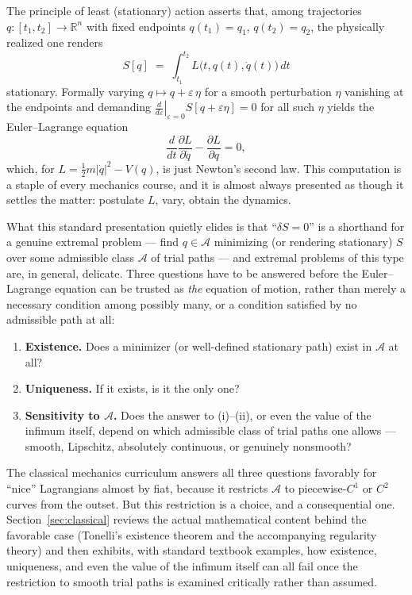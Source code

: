 \documentclass[11pt]{article}
\newcommand{\R}{\mathbb{R}}
\newcommand{\A}{\mathcal{A}}
\newcommand{\eps}{\varepsilon}
\begin{document}
The principle of least (stationary) action asserts that, among trajectories $q:[t_1,t_2]\to\R^n$ with fixed endpoints $q(t_1)=q_1$, $q(t_2)=q_2$, the physically realized one renders
\[
S[q] \;=\; \int_{t_1}^{t_2} L\bigl(t,q(t),\dot q(t)\bigr)\,dt
\]
stationary. Formally varying $q\mapsto q+\eps\,\eta$ for a smooth perturbation $\eta$ vanishing at the endpoints and demanding $\left.\frac{d}{d\eps}\right|_{\eps=0}S[q+\eps\eta]=0$ for all such $\eta$ yields the Euler--Lagrange equation
\[
\frac{d}{dt}\frac{\partial L}{\partial \dot q} - \frac{\partial L}{\partial q} = 0,
\]
which, for $L=\tfrac12 m|\dot q|^2 - V(q)$, is just Newton's second law. This computation is a staple of every mechanics course, and it is almost always presented as though it settles the matter: postulate $L$, vary, obtain the dynamics.

What this standard presentation quietly elides is that ``$\delta S=0$'' is a shorthand for a genuine extremal problem --- find $q\in\A$ minimizing (or rendering stationary) $S$ over some admissible class $\A$ of trial paths --- and extremal problems of this type are, in general, delicate. Three questions have to be answered before the Euler--Lagrange equation can be trusted as \emph{the} equation of motion, rather than merely a necessary condition among possibly many, or a condition satisfied by no admissible path at all:
\begin{enumerate}[label=(\roman*)]
\item \textbf{Existence.} Does a minimizer (or well-defined stationary path) exist in $\A$ at all?
\item \textbf{Uniqueness.} If it exists, is it the only one?
\item \textbf{Sensitivity to $\A$.} Does the answer to (i)--(ii), or even the value of the infimum itself, depend on which admissible class of trial paths one allows --- smooth, Lipschitz, absolutely continuous, or genuinely nonsmooth?
\end{enumerate}
The classical mechanics curriculum answers all three questions favorably for ``nice'' Lagrangians almost by fiat, because it restricts $\A$ to piecewise-$C^1$ or $C^2$ curves from the outset. But this restriction is a choice, and a consequential one. Section~\ref{sec:classical} reviews the actual mathematical content behind the favorable case (Tonelli's existence theorem and the accompanying regularity theory) and then exhibits, with standard textbook examples, how existence, uniqueness, and even the value of the infimum itself can all fail once the restriction to smooth trial paths is examined critically rather than assumed.
\end{document}
